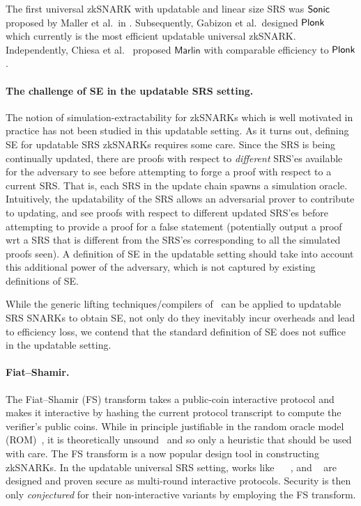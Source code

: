 The first universal zkSNARK with updatable and linear size SRS was
${\textnormal{\textsf{Sonic}}}$ proposed by Maller et al.~in \cite{CCS:MBKM19}. Subsequently, Gabizon et
al.~designed $\textnormal{\textsf{Plonk}}$~\cite{EPRINT:GabWilCio19} which currently is the
most efficient updatable universal zkSNARK. Independently, Chiesa et
al.~\cite{EC:CHMMVW20} proposed $\textsf{Marlin}$ with comparable efficiency to
$\textnormal{\textsf{Plonk}}$.

\paragraph{The challenge of SE in the updatable SRS setting.}

The notion of simulation-extractability for zkSNARKs which is well motivated in practice has not been studied in this updatable setting. As it turns out, defining SE for updatable SRS zkSNARKs requires some care. Since the SRS is being continually updated, there are proofs with respect to \textit{different} SRS'es available for the adversary to see before attempting to forge a proof with respect to a current SRS. 
That is, each SRS in the update chain spawns a simulation oracle. Intuitively, the updatability of the SRS allows an adversarial prover to contribute to updating, and see proofs with respect to different updated SRS'es before attempting to provide a proof for a false statement (potentially output a proof wrt a SRS that is different from the SRS'es corresponding to all the simulated proofs seen). A definition of SE in the updatable setting should take into account this additional power of the adversary, which is not captured by existing definitions of SE.

While the generic lifting techniques/compilers of~\cite{EPRINT:KZMQCP15,CCS:AbdRamSla20} can be applied to updatable SRS SNARKs to obtain SE, not only do they inevitably incur overheads and lead to efficiency loss, we contend that the standard definition of SE does not suffice in the updatable setting.


\paragraph{Fiat--Shamir.}
The Fiat--Shamir (FS) transform takes a public-coin interactive protocol and
makes it interactive by hashing the current protocol transcript to compute the
verifier's public coins. While in principle justifiable in the random oracle
model (ROM)~\cite{CCS:BelRog93}, it is theoretically
unsound~\cite{FOCS:GolKal03} and so only a heuristic that should be used with
care.
%
The FS transform is a now popular design tool in constructing
zkSNARKs. In the updatable universal SRS setting, works like \sonic{}~\cite{CCS:MBKM19}
\plonk{}~\cite{EPRINT:GabWilCio19}, and \marlin~\cite{EC:CHMMVW20} are designed
and proven secure as multi-round interactive protocols. Security is then only
\emph{conjectured} for their non-interactive variants by employing the FS
transform.

